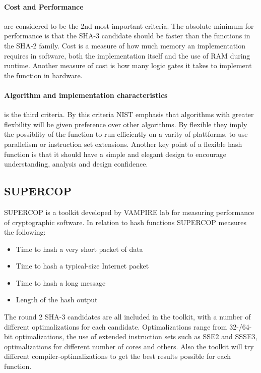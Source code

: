 \documentclass[english,12pt,a4paper]{book}
\begin{document}
\paragraph{Cost and Performance} are considered to be the 2nd most important
criteria. The absolute minimum for performance is that the SHA-3 candidate
should be faster than the functions in the \ac{SHA}-2 family. Cost is a measure
of how much memory an implementation requires in software, both the 
implementation itself and the use of \ac{RAM} during runtime. Another measure
of cost is how many logic gates it takes to implement the function in hardware.

\paragraph{Algorithm and implementation characteristics} is the third criteria.
By this criteria \ac{NIST} emphasis that algorithms with greater flexbility
will be given preference over other algorithms\cite{s_nistround2}. By flexible
they imply the possiblity of the function to run efficiently on a varity of
plattforms, to use parallelism or instruction set extensions. Another key point
of a flexible hash function is that it should have a simple and elegant design
to encourage understanding, analysis and design confidence.

\subsection{\ac{SUPERCOP}}
\ac{SUPERCOP} is a toolkit developed by VAMPIRE lab for measuring performance
of cryptographic software\cite{s_supercop}. In relation to hash functions
\ac{SUPERCOP} measures the following:

\begin{itemize}
    \item Time to hash a very short packet of data
    \item Time to hash a typical-size Internet packet
    \item Time to hash a long message
    \item Length of the hash output
\end{itemize}

The round 2 \ac{SHA}-3 candidates are all included in the toolkit, with a
number of different optimalizations for each candidate. Optimalizations range
from 32-/64-bit optimalizations, the use of extended instruction sets such as
\ac{SSE2} and \ac{SSSE3}, optimalizations for different number of cores and
others. Also the toolkit will try different compiler-optimalizations to get the
best results possible for each function.
\end{document}
